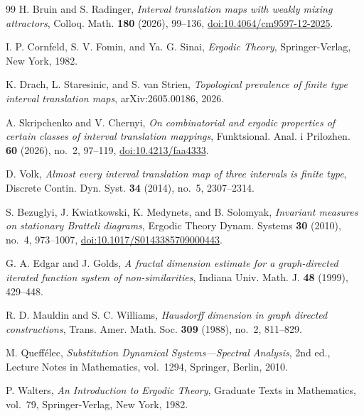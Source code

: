 \documentclass[11pt]{amsart}
\theoremstyle{plain}
\theoremstyle{definition}
\theoremstyle{remark}
\begin{document}
\begin{thebibliography}{99}
H. Bruin and S. Radinger,
\emph{Interval translation maps with weakly mixing attractors},
Colloq. Math. \textbf{180} (2026), 99--136,
\href{https://doi.org/10.4064/cm9597-12-2025}
{doi:10.4064/cm9597-12-2025}.

I. P. Cornfeld, S. V. Fomin, and Ya. G. Sinai,
\emph{Ergodic Theory},
Springer-Verlag, New York, 1982.

K. Drach, L. Staresinic, and S. van Strien,
\emph{Topological prevalence of finite type interval translation maps},
arXiv:2605.00186, 2026.

A. Skripchenko and V. Chernyi,
\emph{On combinatorial and ergodic properties of certain classes of interval translation
mappings},
Funktsional. Anal. i Prilozhen. \textbf{60} (2026), no.~2, 97--119,
\href{https://doi.org/10.4213/faa4333}{doi:10.4213/faa4333}.

D. Volk,
\emph{Almost every interval translation map of three intervals is finite type},
Discrete Contin. Dyn. Syst. \textbf{34} (2014), no.~5, 2307--2314.


S. Bezuglyi, J. Kwiatkowski, K. Medynets, and B. Solomyak,
\emph{Invariant measures on stationary Bratteli diagrams},
Ergodic Theory Dynam. Systems \textbf{30} (2010), no.~4, 973--1007,
\href{https://doi.org/10.1017/S0143385709000443}
{doi:10.1017/S0143385709000443}.

G. A. Edgar and J. Golds,
\emph{A fractal dimension estimate for a graph-directed iterated function system of
non-similarities},
Indiana Univ. Math. J. \textbf{48} (1999), 429--448.

R. D. Mauldin and S. C. Williams,
\emph{Hausdorff dimension in graph directed constructions},
Trans. Amer. Math. Soc. \textbf{309} (1988), no.~2, 811--829.

M. Queff\'{e}lec,
\emph{Substitution Dynamical Systems---Spectral Analysis},
2nd ed., Lecture Notes in Mathematics, vol.~1294,
Springer, Berlin, 2010.

P. Walters,
\emph{An Introduction to Ergodic Theory},
Graduate Texts in Mathematics, vol.~79,
Springer-Verlag, New York, 1982.

\end{thebibliography}
\end{document}
